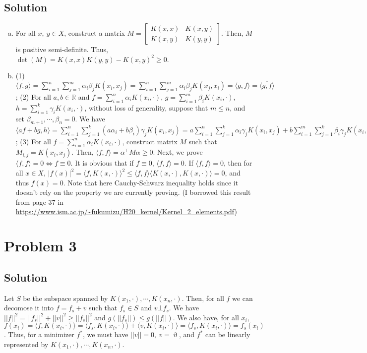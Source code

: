 \documentclass[11pt]{report}
\newcommand{\T}{\intercal}
\begin{document}
\subsection*{Solution}
\begin{enumerate}[(a)]
  \item For all $x,\ y \in X$, construct a matrix $M = \begin{bmatrix}K(x,x) & K(x,y)\\ K(x,y) & K(y,y)\end{bmatrix}$. Then, $M$ is positive semi-definite. Thus, $\det (M) = K(x,x)K(y,y) - K(x,y)^2 \geq 0$.
  \item (1) $\langle f,g \rangle = \sum_{i=1}^{n}\sum_{j=1}^{m} \alpha_i \beta_j K(x_i, x_j) = \sum_{i=1}^{n}\sum_{j=1}^{m} \alpha_i \beta_j K(x_j, x_i) = \langle g,f \rangle = \overline{\langle g,f \rangle}$; (2) For all $a,b \in \mathbb{R}$ and $f = \sum_{i=1}^{n} \alpha_i K(x_i, \cdot)$, $g = \sum_{i=1}^{m} \beta_i K(x_i, \cdot)$, $h = \sum_{i=1}^{k} \gamma_i K(x_i, \cdot)$, without loss of generality, suppose that $m \leq n$, and set $\beta_{m+1},\cdots,\beta_{n} = 0$. We have $\langle af+bg, h \rangle = \sum_{i=1}^{n}\sum_{j=1}^{k} (a\alpha_i + b \beta_i)\gamma_j K(x_i, x_j) = a\sum_{i=1}^{n}\sum_{j=1}^{k} \alpha_i \gamma_j K(x_i, x_j) + b\sum_{i=1}^{m}\sum_{j=1}^{k} \beta_i \gamma_j K(x_i, x_j) = a \langle f,h \rangle + b \langle g,h \rangle$; (3) For all $f = \sum_{i=1}^{n} \alpha_i K(x_i, \cdot)$, construct matrix $M$ such that $M_{i,j} = K(x_i, x_j)$. Then, $\langle f,f \rangle = \alpha^\T M \alpha \geq 0$. Next, we prove $\langle f,f \rangle = 0 \iff f \equiv 0$. It is obvious that if $f \equiv 0$, $\langle f,f \rangle = 0$. If $\langle f,f \rangle = 0$, then for all $x \in X$, $|f(x)|^2 = \langle f, K(x,\cdot) \rangle ^ 2 \leq \langle f,f \rangle \langle K(x,\cdot), K(x,\cdot) \rangle = 0$, and thus $f(x) = 0$. Note that here Cauchy-Schwarz inequality holds since it doesn't rely on the property we are currently proving. (I borrowed this result from page 37 in
  \url{https://www.ism.ac.jp/~fukumizu/H20_kernel/Kernel_2_elements.pdf})
\end{enumerate}

\section*{Problem 3}
\subsection*{Solution}
Let $S$ be the subspace spanned by $K(x_1,\cdot), \cdots, K(x_n, \cdot)$. Then, for all $f$ we can decomose it into $f = f_s + v$ such that $f_s \in S$ and $v \bot f_s$. We have $||f||^2 = ||f_s||^2 + ||v||^2 \geq ||f_s||^2$ and $g(||f_s||) \leq g(||f||)$. We also have, for all $x_i$, $f(x_i) = \langle f,K(x_i,\cdot) \rangle = \langle f_s,K(x_i,\cdot) \rangle + \langle v,K(x_i,\cdot) \rangle = \langle f_s,K(x_i,\cdot) \rangle = f_s(x_i)$. Thus, for a minimizer $f^*$, we must have $||v|| = 0,\ v = \upvartheta$, and $f^*$ can be linearly represented by $K(x_1,\cdot), \cdots, K(x_n, \cdot)$.
\end{document}
